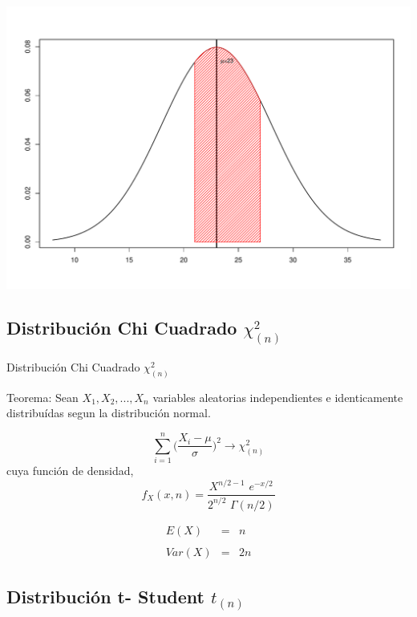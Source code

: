 \documentclass[
  ignorenonframetext,
]{beamer}
\begin{document}
\begin{frame}{}

\includegraphics{clase1Inferencia_files/figure-beamer/unnamed-chunk-6-1.pdf}

\end{frame}

\hypertarget{distribuciuxf3n-chi-cuadrado-chi_n2}{%
\subsection{\texorpdfstring{Distribución Chi Cuadrado
\(\chi_{(n)}^{2}\)}{Distribución Chi Cuadrado \textbackslash chi\_\{(n)\}\^{}\{2\}}}\label{distribuciuxf3n-chi-cuadrado-chi_n2}}

\begin{frame}{Distribución Chi Cuadrado \(\chi_{(n)}^{2}\)}

\justifying Teorema: Sean \(X_1,X_2,...,X_n\) variables aleatorias
independientes e identicamente distribuídas segun la distribución
normal.

\[\sum_{i=1}^{n}\Bigg(\frac{X_i-\mu}{\sigma}\Bigg)^2 \longrightarrow \chi_{(n)}^{2} \]
cuya función de densidad,
\[f_X(x,n)=\displaystyle \frac{X^{n/2-1} \,\,e^{-x/2}}{2^{n/2}\,\,\Gamma(n/2)} \]

\[\begin{array}{rcl}
E(X) & = &n\\ 
 &   & \\ 
Var(X) &  = & 2n
\end{array}\]

\end{frame}

\hypertarget{distribuciuxf3n-t--student-t_n}{%
\subsection{\texorpdfstring{Distribución t- Student
\(t_{(n)}\)}{Distribución t- Student t\_\{(n)\}}}\label{distribuciuxf3n-t--student-t_n}}
\end{document}
